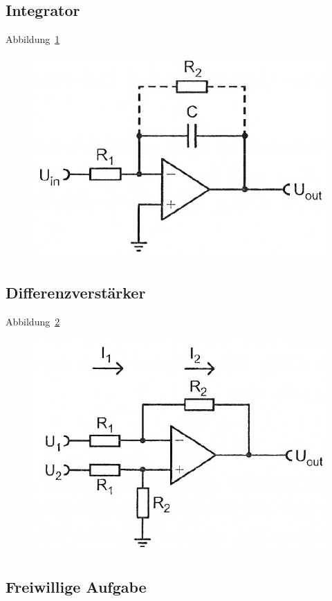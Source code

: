 \FloatBarrier
\subsection{Integrator}

Abbildung~\ref{fig:5_6-11}

\begin{figure}[htbp]
	\centering
	\includegraphics[width=.6\linewidth]{Anleitung/5_6-11.png}
	\caption{%
		\cite[Abbildung~5/6.11]{physik313-Anleitung}
	}
	\label{fig:5_6-11}
\end{figure}

\FloatBarrier
\subsection{Differenzverstärker}

Abbildung~\ref{fig:5_6-7}

\begin{figure}[htbp]
	\centering
	\includegraphics[width=.6\linewidth]{Anleitung/5_6-7.png}
	\caption{%
		\cite[Abbildung~5/6.7]{physik313-Anleitung}
	}
	\label{fig:5_6-7}
\end{figure}

\FloatBarrier
\subsection{Freiwillige Aufgabe}

